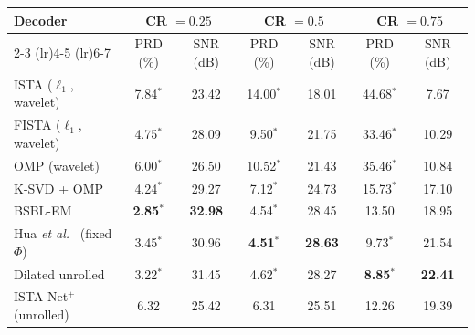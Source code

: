 \begin{tabular}{lcccccc}
\toprule
Decoder & \multicolumn{2}{c}{CR $=0.25$} & \multicolumn{2}{c}{CR $=0.5$} & \multicolumn{2}{c}{CR $=0.75$} \\
\cmidrule(lr){2-3} \cmidrule(lr){4-5} \cmidrule(lr){6-7}
 & PRD (\%) & SNR (dB) & PRD (\%) & SNR (dB) & PRD (\%) & SNR (dB) \\
\midrule
ISTA ($\ell_1$, wavelet) & 7.84$^{\ast}$ & 23.42 & 14.00$^{\ast}$ & 18.01 & 44.68$^{\ast}$ & 7.67 \\
FISTA ($\ell_1$, wavelet) & 4.75$^{\ast}$ & 28.09 & 9.50$^{\ast}$ & 21.75 & 33.46$^{\ast}$ & 10.29 \\
OMP (wavelet) & 6.00$^{\ast}$ & 26.50 & 10.52$^{\ast}$ & 21.43 & 35.46$^{\ast}$ & 10.84 \\
K-SVD + OMP~\cite{aharon2006ksvd} & 4.24$^{\ast}$ & 29.27 & 7.12$^{\ast}$ & 24.73 & 15.73$^{\ast}$ & 17.10 \\
BSBL-EM~\cite{zhang2013fetal} & \textbf{2.85$^{\ast}$} & \textbf{32.98} & 4.54$^{\ast}$ & 28.45 & 13.50 & 18.95 \\
\midrule
Hua \emph{et al.}~\cite{hua2022} (fixed $\Phi$) & 3.45$^{\ast}$ & 30.96 & \textbf{4.51$^{\ast}$} & \textbf{28.63} & 9.73$^{\ast}$ & 21.54 \\
Dilated unrolled~\cite{erkoc2026} & 3.22$^{\ast}$ & 31.45 & 4.62$^{\ast}$ & 28.27 & \textbf{8.85$^{\ast}$} & \textbf{22.41} \\
ISTA-Net$^+$ (unrolled)~\cite{zhang2018} & 6.32 & 25.42 & 6.31 & 25.51 & 12.26 & 19.39 \\
\bottomrule
\end{tabular}